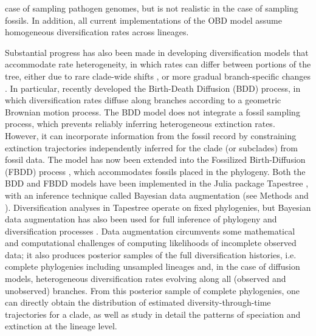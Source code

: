 \documentclass[oupdraft]{sysbio}
\begin{document}
case of sampling pathogen genomes, but is not realistic in the case of sampling fossils. In addition, all current implementations of the OBD model assume homogeneous diversification rates across lineages.

Substantial progress has also been made in developing diversification models that accommodate rate heterogeneity, in which rates can differ between portions of the tree, either due to rare clade-wide shifts \citep{rabosky_automatic_2014, mitchell_inferring_2019, maddison_estimating_2007, caetano_hidden_2018}, or more gradual branch-specific changes \citep{maliet_model_2019, quintero_imbalanced_2024}. In particular, \citet{quintero_imbalanced_2024} recently developed the Birth-Death Diffusion (BDD) process, in which diversification rates diffuse along branches according to a geometric Brownian motion process. The BDD model does not integrate a fossil sampling process, which prevents reliably inferring heterogeneous extinction rates. However, it can incorporate information from the fossil record by constraining extinction trajectories independently inferred for the clade (or subclades) from fossil data. The model has now been extended into the Fossilized Birth-Diffusion (FBDD) process \citep{quintero_rise_2025}, which accommodates fossils placed in the phylogeny. Both the BDD and FBDD models have been implemented in the Julia package Tapestree \citep{quintero_tapestreejl_2020}, with an inference technique called Bayesian data augmentation (see Methods and \citet{tanner_calculation_1987, maliet_fast_2022}). Diversification analyses in Tapestree operate on fixed phylogenies, but Bayesian data augmentation has also been used for full inference of phylogeny and diversification processes \citep{barido-sottani_clads_2023, chabrol_fossilized_2025}. Data augmentation circumvents some mathematical and computational challenges of computing likelihoods of incomplete observed data; it also produces posterior samples of the full diversification histories, i.e. complete phylogenies including unsampled lineages and, in the case of diffusion models, heterogeneous diversification rates evolving along all (observed and unobserved) branches. From this posterior sample of complete phylogenies, one can directly obtain the distribution of estimated diversity-through-time trajectories for a clade, as well as study in detail the patterns of speciation and extinction at the lineage level.
\end{document}
